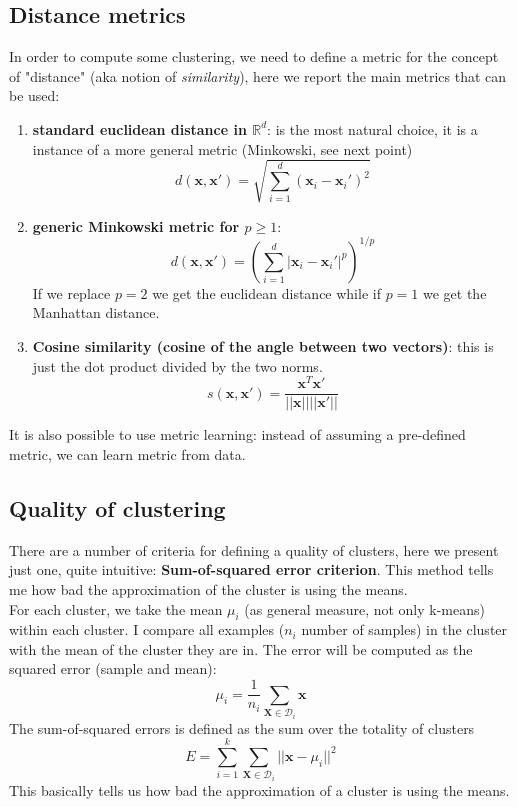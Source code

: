 \subsection{Distance metrics}
In order to compute some clustering, we need to define a metric for the concept of
"distance" (aka notion of \textit{similarity}), here we report the main metrics that
can be used:
\begin{enumerate}
	\item \textbf{standard euclidean distance in $\mathbb{R}^{d}$}: is the most natural
		choice, it is a instance of a more general metric (Minkowski, see next point)
		\[
			d(\pmb{x}, \pmb{x}') = \sqrt{\sum_{i=1}^{d}(\pmb{x}_{i}- \pmb{x}_{i}')^{2}}
		\]

	\item \textbf{generic Minkowski metric for $p \geq 1$}:
		\[
			d(\pmb{x}, \pmb{x}') = \left(\sum_{i=1}^{d}|\pmb{x}_{i}- \pmb{x}_{i}'|^{p}\right
			)^{1/p}
		\]
		If we replace $p=2$ we get the euclidean distance while if $p=1$ we get the Manhattan
		distance.

	\item \textbf{Cosine similarity (cosine of the angle between two vectors)}: this
		is just the dot product divided by the two norms.
		\[
			s(\pmb{x}, \pmb{x}') = \frac{\pmb{x}^{T}\pmb{x}'}{||\pmb{x}|| ||\pmb{x}'||}
		\]
\end{enumerate}

It is also possible to use metric learning: instead of assuming a pre-defined
metric, we can learn metric from data.

\subsection{Quality of clustering}
There are a number of criteria for defining a quality of clusters, here we
present just one, quite intuitive: \textbf{Sum-of-squared error criterion}. This
method tells me how bad the approximation of the cluster is using the means.\\

For each cluster, we take the mean $\mu_{i}$ (as general measure, not only k-means)
within each cluster. I compare all examples ($n_{i}$ number of samples) in the
cluster with the mean of the cluster they are in. The error will be computed as the
squared error (sample and mean):
\[
	\mu_{i}= \frac{1}{n_{i}}\sum_{\pmb{X} \in \mathcal{D}_i}\pmb{x}
\]
The sum-of-squared errors is defined as the sum over the totality of clusters
\[
	E = \sum_{i=1}^{k}\sum_{\pmb{X} \in \mathcal{D}_i}|| \pmb{x}- \mu_{i}||^{2}
\]
This basically tells us how bad the approximation of a cluster is using the
means.

